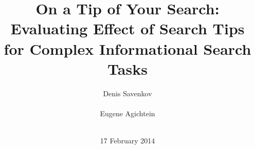 \documentclass{sig-alternate}
\begin{document}
%

\title{On a Tip of Your Search: Evaluating Effect of Search Tips for Complex Informational Search Tasks}

%
%
%
%
%


\author{
\alignauthor
Denis Savenkov\\
       \\
\alignauthor
Eugene Agichtein\\
       \\
}
\date{17 February 2014}
\end{document}
